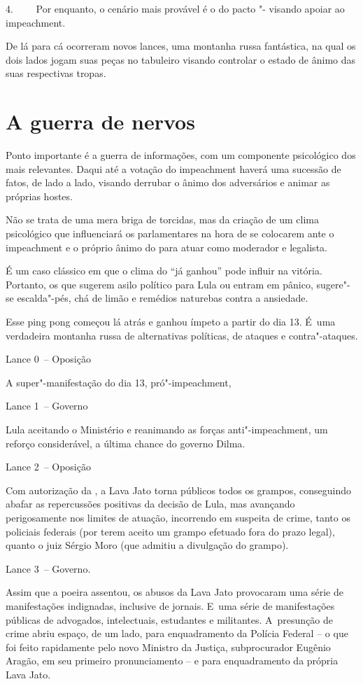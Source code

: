 4.~~~~ Por enquanto, o cenário mais provável é o do pacto "-
visando apoiar ao impeachment.

De lá para cá ocorreram novos lances, uma montanha russa fantástica, na
qual os dois lados jogam suas peças no tabuleiro visando controlar o
estado de ânimo das suas respectivas tropas.

\section{A guerra de nervos}

Ponto importante é a guerra de informações, com um componente
psicológico dos mais relevantes. Daqui até a votação do impeachment
haverá uma sucessão de fatos, de lado a lado, visando derrubar o ânimo
dos adversários e animar as próprias hostes.

Não se trata de uma mera briga de torcidas, mas da criação de um clima
psicológico que influenciará os parlamentares na hora de se colocarem
ante o impeachment e o próprio ânimo do  para atuar como moderador e
legalista.

É um caso clássico em que o clima do ``já ganhou'' pode influir na
vitória. Portanto, os que sugerem asilo político para Lula ou entram em
pânico, sugere"-se escalda"-pés, chá de limão e remédios naturebas contra
a ansiedade.

Esse ping pong começou lá atrás e ganhou ímpeto a partir do dia 13. É~uma verdadeira montanha russa de alternativas políticas, de ataques e
contra"-ataques.

Lance 0~-- Oposição

A super"-manifestação do dia 13, pró"-impeachment,

Lance 1~-- Governo

Lula aceitando o Ministério e reanimando as forças anti"-impeachment, um
reforço considerável, a última chance do governo Dilma.

Lance 2~-- Oposição

Com autorização da , a Lava Jato torna públicos todos os grampos,
conseguindo abafar as repercussões positivas da decisão de Lula, mas
avançando perigosamente nos limites de atuação, incorrendo em suspeita
de crime, tanto os policiais federais (por terem aceito um grampo
efetuado fora do prazo legal), quanto o juiz Sérgio Moro (que admitiu a
divulgação do grampo).

Lance 3~-- Governo.

Assim que a poeira assentou, os abusos da Lava Jato provocaram uma série
de manifestações indignadas, inclusive de jornais. E~uma série de
manifestações públicas de advogados, intelectuais, estudantes e
militantes. A~presunção de crime abriu espaço, de um lado, para
enquadramento da Polícia Federal -- o que foi feito rapidamente pelo
novo Ministro da Justiça, subprocurador Eugênio Aragão, em seu primeiro
pronunciamento -- e para enquadramento da própria Lava Jato.

